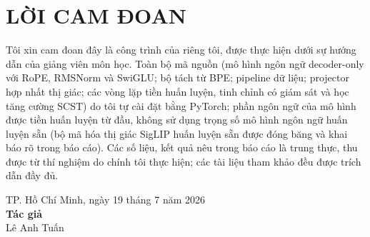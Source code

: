 \chapter*{LỜI CAM ĐOAN}

Tôi xin cam đoan đây là công trình của riêng tôi, được thực hiện dưới sự hướng dẫn
của giảng viên môn học. Toàn bộ mã nguồn (mô hình ngôn ngữ decoder-only với RoPE,
RMSNorm và SwiGLU; bộ tách từ BPE; pipeline dữ liệu; projector hợp nhất thị giác;
các vòng lặp tiền huấn luyện, tinh chỉnh có giám sát và học tăng cường SCST) do tôi
tự cài đặt bằng PyTorch; phần ngôn ngữ của mô hình được tiền huấn luyện từ đầu,
không sử dụng trọng số mô hình ngôn ngữ huấn luyện sẵn (bộ mã hóa thị giác SigLIP
huấn luyện sẵn được đóng băng và khai báo rõ trong báo cáo). Các số liệu, kết quả
nêu trong báo cáo là trung thực, thu được từ thí nghiệm do chính tôi thực hiện;
các tài liệu tham khảo đều được trích dẫn đầy đủ.

\vspace{1.5cm}
\begin{flushright}
	TP. Hồ Chí Minh, ngày 19 tháng 7 năm 2026\\[0.3cm]
	\textbf{Tác giả}\\[2cm]
	Lê Anh Tuấn
\end{flushright}
\clearpage
